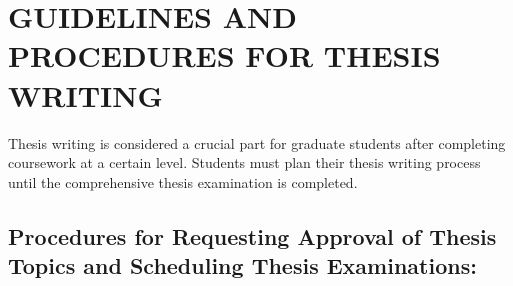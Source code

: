 \appendix

\chapter{GUIDELINES AND PROCEDURES FOR THESIS WRITING}

Thesis writing is considered a crucial part for graduate students after completing coursework at a certain level. Students must plan their thesis writing process until the comprehensive thesis examination is completed.

\section{Procedures for Requesting Approval of Thesis Topics and Scheduling Thesis Examinations:}

